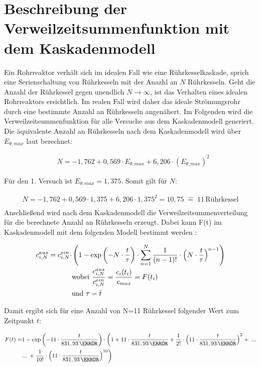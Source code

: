 \documentclass[12pt,liststotoc]{report}
\begin{document}
\newpage

\section{Beschreibung der Verweilzeitsummenfunktion mit dem Kaskadenmodell}
\label{sec:kaskade}


Ein Rohrreaktor verhält sich im idealen Fall wie eine Rührkesselkaskade, sprich eine Serienschaltung von Rührkesseln mit der Anazhl an $N$ Rührkesseln. Geht die Anzahl der Rührkessel gegen unendlich $N \rightarrow \infty$, ist das Verhalten eines idealen Rohrreaktors ersichtlich. Im realen Fall wird daher das ideale Strömungsrohr durch eine bestimmte Anzahl an Rührkesseln angenähert. Im Folgenden wird die Verweilzeitsummenfunktion für alle Versuche aus dem Kaskadenmodell generiert. Die äquivalente Anzahl an Rührkesseln nach dem Kaskadenmodell wird über $E_{\theta,max}$ laut \cite{Skript_2018} berechnet:

\begin{align}
&N = -1,762 + 0,569\cdot E_{\theta,max} + 6,206\cdot (E_{\theta,max})^2
\end{align}

Für den 1. Versuch ist $E_{\theta,max} = 1,375$. Somit gilt für $N$:

\begin{align*}
N = -1,762 + 0,569\cdot 1,375 + 6,206\cdot 1,375^2 = 10,75 \;\widehat{=}\;11\,\text{Rührkessel}\\
\end{align*}
Anschließend wird nach dem Kaskadenmodell die Verweilzeitsummenverteilung für die berechnete Anzahl an Rührkesseln erzeugt. Dabei kann F(t) im Kaskadenmodell mit dem folgenden Modell bestimmt werden \cite{Chem_Reaktion_2018}:

\begin{align}
c_{i,N}^{aus}=c_{i,N}^{ein} \cdot &\left(1-\text{exp}\left(-N\cdot\frac{t}{\tau}\right) \cdot \sum\limits_{n = 1}^N\frac{1}{(n-1)!}\cdot\Bigl(N\cdot\frac{t}{\tau}\Bigr)^{n-1}\right) \\
&\text{wobei } \frac{c_{i,N}^{aus}}{c_{i,N}^{ein}}= \frac{c_i(t_i)}{c_{max}}=F(t_i)\nonumber\\
&\text{und } \tau = \bar{t}\notag
\end{align}

Damit ergibt sich für eine Anzahl von N=11 Rührkessel folgender Wert zum Zeitpunkt $t$:

\begin{align*}
F(t)=&1-\text{exp}\left(-11\cdot\frac{t}{831,93\,\s}\right) \cdot \biggl(1+11\cdot\frac{t}{831,93\,\s} + \frac{1}{2!}\cdot \Bigl(11\cdot\frac{t}{831,93\,\s}\Bigr)^2 +\;...\\
&...\;+\frac{1}{10!}\cdot\Bigl(11\cdot\frac{t}{831,93\,\s}\Bigr)^{10} \biggr) \notag
\end{align*}
\end{document}
